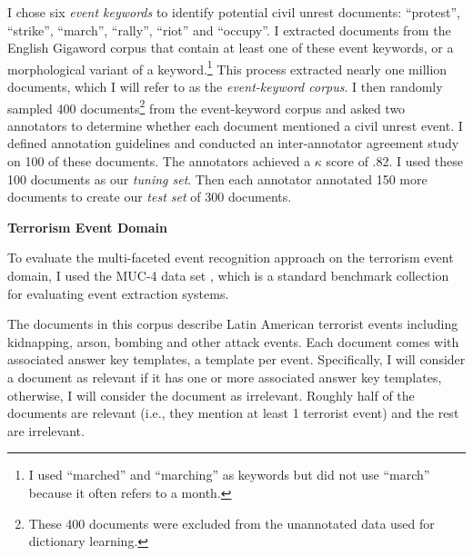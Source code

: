 I chose six {\it event
  keywords} to identify potential civil unrest documents: ``protest'',
``strike'', ``march'', ``rally'', ``riot'' and ``occupy''.  I
extracted documents from the English Gigaword corpus \cite{Gigaword}
that contain at least one of these event keywords, or a morphological variant
of a keyword.\footnote{I used ``marched'' and ``marching'' as
  keywords but did not use ``march'' because it often refers to a
  month.}
This process extracted nearly one
million documents, which I will refer to as the {\it event-keyword corpus}.
I then randomly sampled 400 documents\footnote{These 400 documents were
  excluded from the unannotated data used for dictionary learning.}
from the event-keyword corpus and asked two annotators to determine
whether each document mentioned a civil unrest event.
I defined annotation guidelines and conducted an inter-annotator agreement
study
on 100 of these documents.  The annotators achieved a $\kappa$ score of .82.  I used
these 100 documents as our {\it tuning set}.  Then each
annotator annotated 150 more documents to create our {\it test set} of 300 documents.

\vspace{.1in}
{\bf Terrorism Event Domain}
\vspace{.1in}

To evaluate the multi-faceted event recognition approach 
on the terrorism event domain, I used 
the MUC-4 data set
\cite{muc4-proceedings}, 
which is a standard benchmark collection 
for evaluating event extraction systems. 

The documents in this corpus describe
Latin American terrorist
events including kidnapping, arson, bombing and other attack events.
Each document comes with associated answer key templates, a template per event. 
Specifically, I will 
consider a document as relevant if it has 
one or more associated answer key templates, otherwise, 
I will consider the document as irrelevant.  
Roughly half of the
documents are relevant (i.e., they mention
at least 1 terrorist event) and the rest are irrelevant. 

